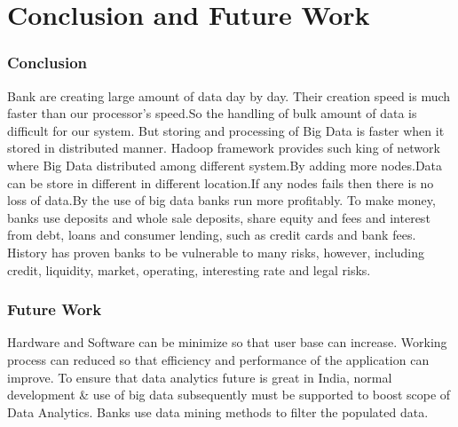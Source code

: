 \chapter{Conclusion and Future Work}
\subsection{Conclusion}
Bank are creating large amount of data day by day. Their creation speed is much faster than our processor's speed.So the handling of bulk amount of data is difficult for our system. But storing and processing of Big Data is faster when it stored in distributed manner. Hadoop framework provides such king of network where Big Data distributed among different system.By adding more nodes.Data can be store in different in different location.If any nodes fails then there is no loss of data.By the use of big data banks run more profitably. To make money, banks use deposits and whole sale deposits, share equity and fees and interest from debt, loans and consumer lending, such as credit cards and bank fees. History has proven banks to be vulnerable to many risks, however, including credit, liquidity, market, operating, interesting rate and legal risks.\newpage
\subsection{Future Work}
Hardware and Software can be minimize so that user base can increase.\newline
Working process can reduced so that efficiency and performance of the application can improve.\newline
To ensure that data analytics future is great in India, normal development & use of big data subsequently must be supported to boost scope of Data Analytics. Banks use data mining methods to filter the populated data. 